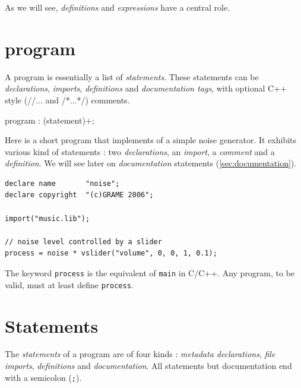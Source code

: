 \documentclass[a4paper,10pt]{book}
\begin{document}
As we will see, \textit{definitions} and \textit{expressions} have a central role.

\section{\faust program}

A \faust program is essentially a list of \textit{statements}. These statements can be \textit{declarations}, \textit{imports}, \textit{definitions} and \textit{documentation tags}, with optional C++ style (//... and /*...*/) comments.
 
\begin{rail}
program : (statement)+;
\end{rail}

Here is a short \faust program that implements of a simple noise generator. It exhibits various kind of statements : two \textit{declarations}, an \textit{import}, a \textit{comment} and a \textit{definition}. We will see later on \textit{documentation} statements (\ref{sec:documentation}).

\begin{lstlisting}
declare name       "noise";
declare copyright  "(c)GRAME 2006";

import("music.lib");

// noise level controlled by a slider
process = noise * vslider("volume", 0, 0, 1, 0.1);
\end{lstlisting}
 
The keyword \lstinline'process' is the equivalent of \lstinline'main' in C/C++. Any \faust program, to be valid, must at least define \lstinline'process'.


\section{Statements}

The \textit{statements} of a \faust program are of four kinds : \textit{metadata declarations}, \textit{file imports},  \textit{definitions} and \textit{documentation}. All statements but documentation end with a semicolon (\lstinline';'). 
% 
\end{document}
